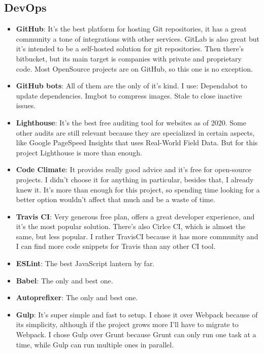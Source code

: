 \subsection*{DevOps}
\begin{itemize}
    \item \textbf{GitHub}: It's the best platform for hosting Git repositories, it has a great community a tone of integrations with other services. GitLab is also great but it's intended to be a self-hosted solution for git repositories. Then there's bitbucket, but its main target is companies with private and proprietary code. Most OpenSource projects are on GitHub, so this one is no exception.
    \item \textbf{GitHub bots}: All of them are the only of it's kind. I use: Dependabot to update dependencies. Imgbot to compress images. Stale to close inactive issues.
    \item \textbf{Lighthouse}: It's the best free auditing tool for websites as of 2020. Some other audits are still relevant because they are specialized in certain aspects, like Google PageSpeed Insights that uses Real-World Field Data. But for this project Lighthouse is more than enough.
    \item \textbf{Code Climate}: It provides really good advice and it's free for open-source projects. I didn't choose it for anything in particular, besides that, I already knew it. It's more than enough for this project, so spending time looking for a better option wouldn't affect that much and be a waste of time.
    \item \textbf{Travis CI}: Very generous free plan, offers a great developer experience, and it's the most popular solution. There's also Cirlce CI, which is almost the same, but less popular. I rather TravisCI because it has more community and I can find more code snippets for Travis than any other CI tool.
    \item \textbf{ESLint}: The best JavaScript lantern by far.
    \item \textbf{Babel}: The only and best one.
    \item \textbf{Autoprefixer}: The only and best one.
    \item \textbf{Gulp}: It's super simple and fast to setup. I chose it over Webpack because of its simplicity, although if the project grows more I'll have to migrate to Webpack. I chose Gulp over Grunt because Grunt can only run one task at a time, while Gulp can run multiple ones in parallel.
\end{itemize}
